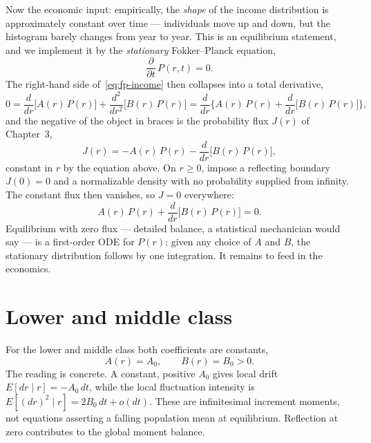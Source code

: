 Now the economic input: empirically, the \emph{shape} of the income distribution is approximately constant over time --- individuals move up and down, but the histogram barely changes from year to year.
This is an equilibrium statement, and we implement it by the \emph{stationary} Fokker--Planck equation,
\begin{equation}
\frac{\partial}{\partial t}\, P(r,t) = 0.
\end{equation}
The right-hand side of~\eqref{eq:fp-income} then collapses into a total derivative,
\begin{equation}
0 = \frac{d}{dr}\bigl[A(r)\, P(r)\bigr] + \frac{d^2}{dr^2}\bigl[B(r)\, P(r)\bigr] = \frac{d}{dr}\biggl\{A(r)\, P(r) + \frac{d}{dr}\bigl[B(r)\, P(r)\bigr]\biggr\},
\end{equation}
and the negative of the object in braces is the probability flux $J(r)$ of Chapter~3,
\begin{equation}
J(r) = -A(r)\, P(r) - \frac{d}{dr}\bigl[B(r)\, P(r)\bigr],
\end{equation}
constant in $r$ by the equation above.
On $r\ge0$, impose a reflecting boundary $J(0)=0$ and a normalizable density with no probability supplied from infinity.
The constant flux then vanishes, so $J=0$ everywhere:
\begin{equation}\label{eq:flux-zero}
A(r)\, P(r) + \frac{d}{dr}\bigl[B(r)\, P(r)\bigr] = 0.
\end{equation}
Equilibrium with zero flux --- detailed balance, a statistical mechanician would say --- is a first-order ODE for $P(r)$: given any choice of $A$ and $B$, the stationary distribution follows by one integration.
It remains to feed in the economics.


\section{Lower and middle class}\label{sec:lower-class}

For the lower and middle class both coefficients are constants,
\begin{equation}
A(r) = A_0, \qquad B(r) = B_0 > 0.
\end{equation}
The reading is concrete.
A constant, positive $A_0$ gives local drift $E[dr\mid r]=-A_0\,dt$, while the local fluctuation intensity is $E[(dr)^2\mid r]=2B_0\,dt+o(dt)$.
These are infinitesimal increment moments, not equations asserting a falling population mean at equilibrium.
Reflection at zero contributes to the global moment balance.


